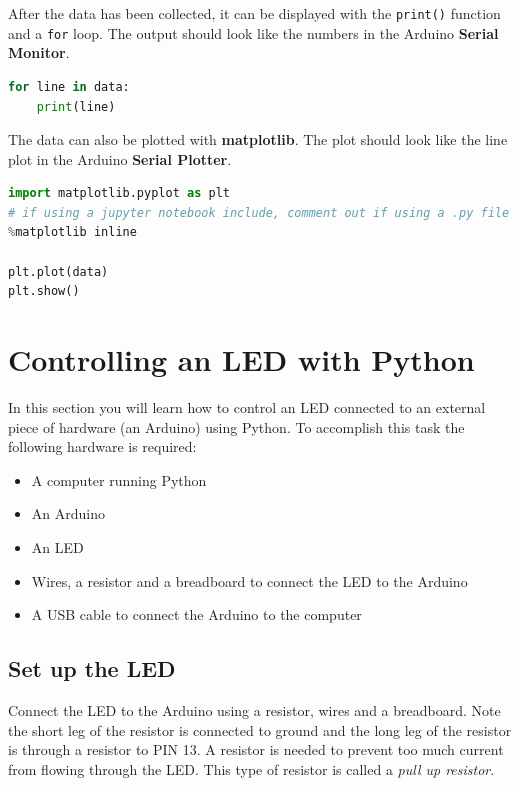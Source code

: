 \documentclass{book}
\providecommand{\tightlist}{%
      \setlength{\itemsep}{0pt}\setlength{\parskip}{0pt}}
\begin{document}
    After the data has been collected, it can be displayed with the
\lstinline!print()! function and a \lstinline!for! loop. The output
should look like the numbers in the Arduino \textbf{Serial Monitor}.

    \begin{lstlisting}[language=Python]
for line in data:
    print(line)
\end{lstlisting}

    The data can also be plotted with \textbf{matplotlib}. The plot should
look like the line plot in the Arduino \textbf{Serial Plotter}.

    \begin{lstlisting}[language=Python]
import matplotlib.pyplot as plt
# if using a jupyter notebook include, comment out if using a .py file
%matplotlib inline

plt.plot(data)
plt.show()
\end{lstlisting}

    \section{Controlling an LED with
Python}\label{controlling-an-led-with-python}

    In this section you will learn how to control an LED connected to an
external piece of hardware (an Arduino) using Python. To accomplish this
task the following hardware is required:

\begin{itemize}
\tightlist
\item
  A computer running Python
\item
  An Arduino
\item
  An LED
\item
  Wires, a resistor and a breadboard to connect the LED to the Arduino
\item
  A USB cable to connect the Arduino to the computer
\end{itemize}

    \subsection{Set up the LED}\label{set-up-the-led}

    Connect the LED to the Arduino using a resistor, wires and a breadboard.
Note the short leg of the resistor is connected to ground and the long
leg of the resistor is through a resistor to PIN 13. A resistor is
needed to prevent too much current from flowing through the LED. This
type of resistor is called a \emph{pull up resistor}.
\end{document}
